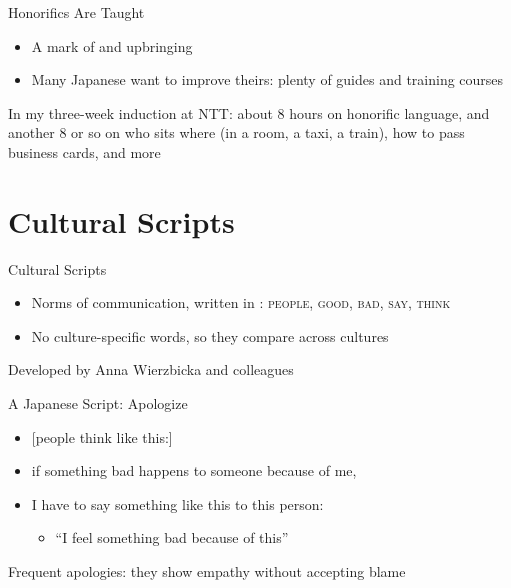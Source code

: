 \documentclass{beamer}
\begin{document}
\begin{frame}{Honorifics Are Taught}
  \Large
  \begin{itemize}
  \item A mark of  and upbringing
  \item Many Japanese want to improve theirs: plenty of guides and training courses
  \end{itemize}
  \vfill
  \normalsize
  In my three-week induction at NTT: about 8 hours on honorific language,
  and another 8 or so on who sits where (in a room, a taxi, a train),
  how to pass business cards, and more
\end{frame}

\section{Cultural Scripts}

\begin{frame}{Cultural Scripts}
  \Large
  \begin{itemize}
  \item Norms of communication, written in :
    \textsc{people}, \textsc{good}, \textsc{bad}, \textsc{say}, \textsc{think}
  \item No culture-specific words, so they compare across cultures
  \end{itemize}
  \vfill
  \normalsize
  Developed by Anna Wierzbicka and colleagues
\end{frame}

\begin{frame}{A Japanese Script: Apologize}
  \begin{nsm}
  \begin{itemize}
  \item {}[people think like this:]
  \item if something bad happens to someone because of me,
  \item I have to say something like this to this person:
    \begin{itemize}
    \item ``I feel something bad because of this''
    \end{itemize}
  \end{itemize}
  \end{nsm}
  \vfill
  \large
  Frequent apologies: they show empathy without accepting blame
\end{frame}
\end{document}
